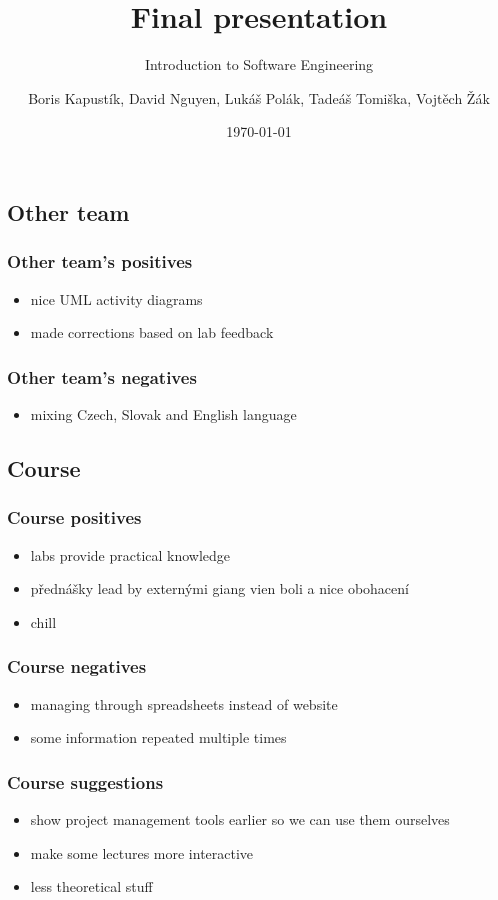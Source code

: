 \documentclass{beamer}
\title{Final presentation}
\subtitle{Introduction to Software Engineering}
\author[Kapustík, Nguyen, Polák, Tomiška, Žák]{Boris Kapustík, David Nguyen, Lukáš Polák, Tadeáš Tomiška, Vojtěch Žák}
\institute[]{Faculty of Mathematics and Physics, Charles University}
\date{\today}
\begin{document}

\begin{frame}
	\titlepage
\end{frame}

\subsection{Other team}
\begin{frame}
	\frametitle{Other team's positives}
	\begin{itemize}
		\item nice UML activity diagrams
		\item made corrections based on lab feedback
	\end{itemize}
\end{frame}

\begin{frame}
	\frametitle{Other team's negatives}
	\begin{itemize}
		\item mixing Czech, Slovak and English language
	\end{itemize}
\end{frame}

\subsection{Course}
\begin{frame}
	\frametitle{Course positives}
	\begin{itemize}
		\item labs provide practical knowledge
		\item přednášky lead by externými giang vien boli a nice obohacení
		\item chill
	\end{itemize}
\end{frame}

\begin{frame}
	\frametitle{Course negatives}
	\begin{itemize}
		\item managing through spreadsheets instead of website
		\item some information repeated multiple times
	\end{itemize}
\end{frame}

\begin{frame}
	\frametitle{Course suggestions}
	\begin{itemize}
		\item show project management tools earlier so we can use them ourselves
		\item make some lectures more interactive
		\item less theoretical stuff
	\end{itemize}
\end{frame}
\end{document}
